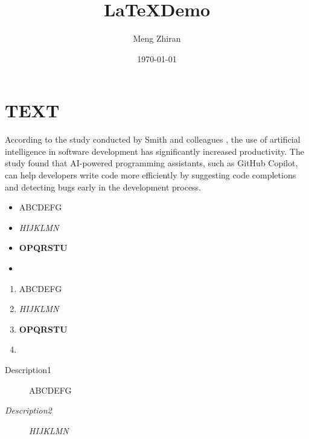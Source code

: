 \documentclass[a4paper,12pt]{article}
\title{\textbf{\LaTeX Demo}}
\author{Meng Zhiran}
\date{\today}
\begin{document}
\tableofcontents

\thispagestyle{empty}
\newpage

\listoffigures
\listoftables
\listofalgorithms
\thispagestyle{empty}
\newpage

\maketitle

\setcounter{page}{1}
\thispagestyle{fancy}


\section{TEXT}

According to the study conducted by Smith and colleagues \cite{bhagat2017,bittencourt2022,brennan2017,doblhofer2015}, the use of artificial intelligence in software development
has significantly increased productivity. The study found that AI-powered programming assistants, such as GitHub Copilot, can help 
developers write code more efficiently by suggesting code completions and detecting bugs early in the development process.

\begin{itemize}
    \item ABCDEFG
    \item \emph{HIJKLMN}
    \item \textbf{OPQRSTU}
    \item {}
\end{itemize}

\lipsum[1]


\begin{enumerate}
    \item ABCDEFG
    \item \emph{HIJKLMN}
    \item \textbf{OPQRSTU}
    \item {}
\end{enumerate}

\lipsum[1]

\begin{description}
    \item[Description1] ABCDEFG
    \item[\emph{Description2}] \emph{HIJKLMN}
\end{description}
\end{document}
